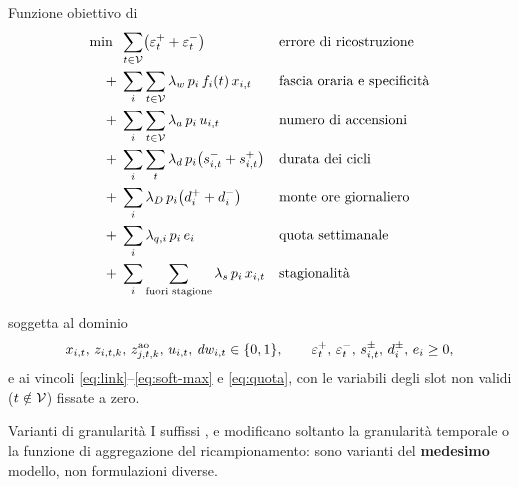 \begin{modelbox}{Funzione obiettivo di }
\begin{align*}
  \min \;\;
  & \sum_{t \in \mathcal{V}} \bigl( \varepsilon^{+}_t + \varepsilon^{-}_t \bigr)
  && \text{errore di ricostruzione} \\
  + \; & \sum_{i} \sum_{t \in \mathcal{V}} \lambda_w \, p_i \, f_i(t) \, x_{i,t}
  && \text{fascia oraria e specificità} \\
  + \; & \sum_{i} \sum_{t \in \mathcal{V}} \lambda_a \, p_i \, u_{i,t}
  && \text{numero di accensioni} \\
  + \; & \sum_{i} \sum_{t} \lambda_d \, p_i \bigl( s^{-}_{i,t} + s^{+}_{i,t} \bigr)
  && \text{durata dei cicli} \\
  + \; & \sum_{i} \lambda_D \, p_i \bigl( d^{+}_i + d^{-}_i \bigr)
  && \text{monte ore giornaliero} \\
  + \; & \sum_{i} \lambda_{q,i} \, p_i \, e_i
  && \text{quota settimanale} \\
  + \; & \sum_{i} \sum_{\text{fuori stagione}} \lambda_s \, p_i \, x_{i,t}
  && \text{stagionalità}
\end{align*}
\end{modelbox}

soggetta al dominio
\begin{equation*}
  x_{i,t},\, z_{i,t,k},\, z^{\text{ao}}_{j,t,k},\, u_{i,t},\, \mathit{dw}_{i,t} \in \{0,1\},
  \qquad \varepsilon^{+}_t,\, \varepsilon^{-}_t,\, s^{\pm}_{i,t},\, d^{\pm}_i,\, e_i \ge 0 ,
\end{equation*}
e ai vincoli \eqref{eq:link}--\eqref{eq:soft-max} e \eqref{eq:quota}, con le variabili degli slot
non validi ($t \notin \mathcal{V}$) fissate a zero.

\begin{notebox}{Varianti di granularità}
I suffissi ,  e  modificano soltanto la granularità
temporale o la funzione di aggregazione del ricampionamento: sono varianti del \textbf{medesimo}
modello, non formulazioni diverse.
\end{notebox}
